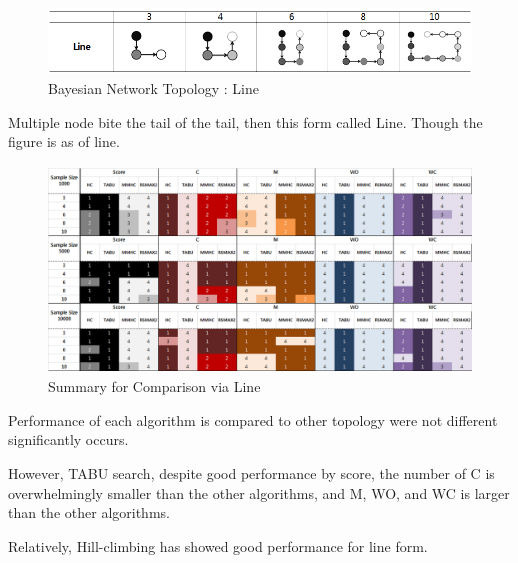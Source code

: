	\begin{figure}[!bhp]
	\centering
		\includegraphics[height=50pt]{Topologies_Line}
		\caption{Bayesian Network Topology : Line}
	\end{figure}	

	Multiple node bite the tail of the tail, then this form called Line. Though the figure is as of line.

	\begin{figure}[!bhp]
	\centering
		\includegraphics[height=155pt]{Result_Line}
		\caption{Summary for Comparison via Line}
	\end{figure}	
	
Performance of each algorithm is compared to other topology were not different significantly occurs.

However, TABU search, despite good performance by score, the number of C is overwhelmingly smaller than the other algorithms, and M, WO, and WC is larger than the other algorithms.

Relatively, Hill-climbing has showed good performance for line form.


